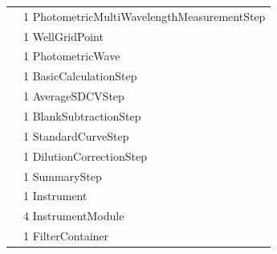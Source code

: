 \documentclass[UTF8,10pt,a4paper,fontset=fandol]{ctexart}
\newcommand{\fieldvalue}[1]{#1}
\begin{document}
\begin{tabular}{@{}p{2.5cm}p{12cm}@{}}
&
\fieldvalue{1 PhotometricMultiWavelengthMeasurementStep} \\

&
\fieldvalue{1 WellGridPoint} \\

&
\fieldvalue{1 PhotometricWave} \\

&
\fieldvalue{1 BasicCalculationStep} \\

&
\fieldvalue{1 AverageSDCVStep} \\

&
\fieldvalue{1 BlankSubtractionStep} \\

&
\fieldvalue{1 StandardCurveStep} \\

&
\fieldvalue{1 DilutionCorrectionStep} \\

&
\fieldvalue{1 SummaryStep} \\

&
\fieldvalue{1 Instrument} \\

&
\fieldvalue{4 InstrumentModule} \\

&
\fieldvalue{1 FilterContainer} \\
\end{tabular}

\vspace{0.8em}
\end{document}
